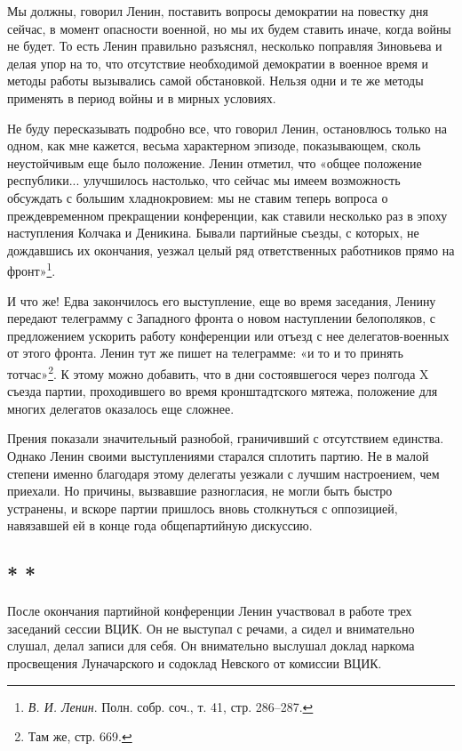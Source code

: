\documentclass[12pt, a4paper, openany]{book}
\begin{document}
Мы должны, говорил Ленин, поставить вопросы демократии на повестку дня сейчас, в момент опасности военной, но мы их будем ставить иначе, когда войны не будет. То есть Ленин правильно разъяснял, несколько поправляя Зиновьева и делая упор на то, что отсутствие необходимой демократии в военное время и методы работы вызывались самой обстановкой. Нельзя одни и те же методы применять в период войны и в мирных условиях.

Не буду пересказывать подробно все, что говорил Ленин, остановлюсь только на одном, как мне кажется, весьма характерном эпизоде, показывающем, сколь неустойчивым еще было положение. Ленин отметил, что «общее положение республики... улучшилось настолько, что сейчас мы имеем возможность обсуждать с большим хладнокровием: мы не ставим теперь вопроса о преждевременном прекращении конференции, как ставили несколько раз в эпоху наступления Колчака и Деникина. Бывали партийные съезды, с которых, не дождавшись их окончания, уезжал целый ряд ответственных работников прямо на фронт»\footnote{\textit{В. И. Ленин}. Полн. собр. соч., т. 41, стр. 286–287.}.

И что же! Едва закончилось его выступление, еще во время заседания, Ленину передают телеграмму с Западного фронта о новом наступлении белополяков, с предложением ускорить работу конференции или отъезд с нее делегатов-военных от этого фронта. Ленин тут же пишет на телеграмме: «и то и то принять тотчас»\footnote{Там же, стр. 669.}. К этому можно добавить, что в дни состоявшегося через полгода X съезда партии, проходившего во время кронштадтского мятежа, положение для многих делегатов оказалось еще сложнее.

Прения показали значительный разнобой, граничивший с отсутствием единства. Однако Ленин своими выступлениями старался сплотить партию. Не в малой степени именно благодаря этому делегаты уезжали с лучшим настроением, чем приехали. Но причины, вызвавшие разногласия, не могли быть быстро устранены, и вскоре партии пришлось вновь столкнуться с оппозицией, навязавшей ей в конце года общепартийную дискуссию.

\subsection*{\center * * *}

После окончания партийной конференции Ленин участвовал в работе трех заседаний сессии ВЦИК. Он не выступал с речами, а сидел и внимательно слушал, делал записи для себя. Он внимательно выслушал доклад наркома просвещения Луначарского и содоклад Невского от комиссии ВЦИК.
\end{document}
